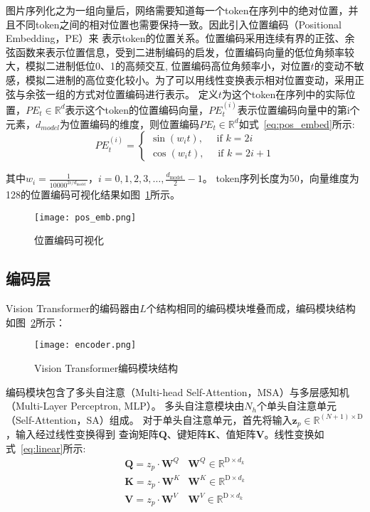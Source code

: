 图片序列化之为一组向量后，网络需要知道每一个token在序列中的绝对位置，并且不同token之间的相对位置也需要保持一致。因此引入位置编码（Positional Embedding，PE）来
表示token的位置关系。位置编码采用连续有界的正弦、余弦函数来表示位置信息，受到二进制编码的启发，位置编码向量的低位角频率较大，模拟二进制低位0、1的高频交互,
位置编码高位角频率小，对位置$t$的变动不敏感，模拟二进制的高位变化较小。为了可以用线性变换表示相对位置变动，采用正弦与余弦一组的方式对位置编码进行表示。
定义$t$为这个token在序列中的实际位置，$P E_{t} \in \mathbb{R}^{d}$表示这个token的位置编码向量，$P E_{t}^{(i)}$表示位置编码向量中的第i个
元素，$d_{model}$为位置编码的维度，则位置编码$P E_{t} \in \mathbb{R}^{d}$如式~\ref{eq:pos_embed}所示:
\begin{equation}
  P E_{t}^{(i)}=\left\{\begin{array}{l}
  \sin \left(w_{i} t\right), \quad \text { if } k=2 i \\
  \cos \left(w_{i} t\right), \quad \text { if } k=2 i+1
  \end{array}\right.
  \label{eq:pos_embed}
\end{equation}

其中$w_{i}=\frac{1}{10000^{2 i / d_{\text {model }}}}$，$i=0,1,2,3, \ldots, \frac{d_{\text {model }}}{2}-1$。
token序列长度为50，向量维度为128的位置编码可视化结果如图~\ref{fig:pos_embed}所示。
\begin{figure} 
   \centering   
   \texttt{[image: pos\_emb.png]}   
   \caption{位置编码可视化}   
   \label{fig:pos_embed} 
\end{figure}  

\subsection{编码层}
Vision Transformer的编码器由$L$个结构相同的编码模块堆叠而成，编码模块结构如图~\ref{fig:encoder}所示：
\begin{figure} 
   \centering   
   \texttt{[image: encoder.png]}   
   \caption{Vision Transformer编码模块结构}   
   \label{fig:encoder} 
\end{figure}  

编码模块包含了多头自注意（Multi-head Self-Attention，MSA）与多层感知机（Multi-Layer Perceptron, MLP）。
多头自注意模块由$N_h$个单头自注意单元（Self-Attention，SA）组成。
对于单头自注意单元，首先将输入$\mathbf{z}_{p} \in \mathbb{R}^{(N+1) \times \mathrm{D}}$，输入经过线性变换得到
查询矩阵$\boldsymbol{Q}$、键矩阵$\boldsymbol{K}$、值矩阵$\boldsymbol{V}$。线性变换如式~\ref{eq:linear}所示:
\begin{equation}
  \begin{array}{ll}
  \boldsymbol{Q}=z_{p} \cdot \boldsymbol{W}^{Q} & \boldsymbol{W}^{Q} \in \mathbb{R}^{\mathrm{D} \times d_{k}} \\
  \boldsymbol{K}=z_{p} \cdot \boldsymbol{W}^{K} & \boldsymbol{W}^{K} \in \mathbb{R}^{\mathrm{D} \times d_{k}} \\
  \boldsymbol{V}=z_{p} \cdot \boldsymbol{W}^{V} & \boldsymbol{W}^{V} \in \mathbb{R}^{\mathrm{D} \times d_{k}}
  \end{array}
  \label{eq:linear}
\end{equation}

